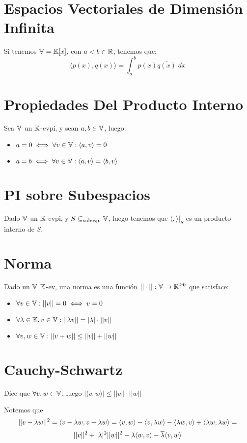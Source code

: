 \documentclass{article}
\begin{document}
\section*{Espacios Vectoriales de Dimensión Infinita}
Si tenemos $\mathbb{V} = \mathbb{K}[x]$, con $a < b \in \mathbb{R}$, tenemos que:
\[
	\langle p(x), q(x) \rangle = \int_a^b p(x)\overline {q(x)} \; dx
\]

\section*{Propiedades Del Producto Interno}
Sea $\mathbb{V}$ un $\mathbb{K}$-evpi, y sean $a, b \in \mathbb{V}$, luego:
\begin{itemize}
	\item $a = 0 \iff \forall v \in \mathbb{V} : \langle a, v \rangle = 0$
	\item $a = b \iff \forall v \in \mathbb{V} : \langle a, v \rangle = \langle b, v \rangle$
\end{itemize}

\section*{PI sobre Subespacios}
Dado $\mathbb{V}$ un $\mathbb{K}$-evpi, y $S \subseteq_{\text{subesp.}} \mathbb{V}$, luego tenemos que $\langle,\rangle|_S$ es un producto interno de $S$.

\section*{Norma}
Dado un $\mathbb{V}$ $\mathbb{K}$-ev, una norma es una función $|| \cdot || : \mathbb{V} \to \mathbb{R}^{\geq  0}$ que satisface:
\begin{itemize}
	\item $\forall v \in \mathbb{V} : ||v|| = 0 \iff v = 0$
	\item $\forall \lambda \in \mathbb{K}, v \in \mathbb{V} : ||\lambda v|| = |\lambda| \cdot ||v||$
	\item $\forall v, w \in \mathbb{V} : ||v+w|| \leq ||v|| + ||w||$
\end{itemize}

\section*{Cauchy-Schwartz}
Dice que $\forall v, w \in \mathbb{V}$, luego $|\langle v, w \rangle| \leq ||v|| \cdot ||w||$

Notemos que
\[||v - \lambda w||^2 = \langle v - \lambda w, v - \lambda w \rangle = \langle v, w \rangle - \langle v, \lambda w \rangle - \langle \lambda w, v \rangle + \langle \lambda w, \lambda w \rangle =\]
\[||v||^2 + |\lambda|^2||w||^2 - \lambda \langle w, v \rangle - \overline {\lambda} \langle v, w \rangle\]
\end{document}
